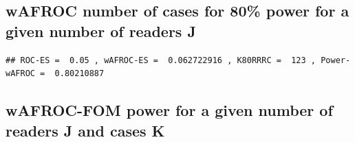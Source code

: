 \documentclass[
]{book}
\newenvironment{Shaded}{\begin{snugshade}}{\end{snugshade}}
\newcommand{\AttributeTok}[1]{\textcolor[rgb]{0.77,0.63,0.00}{#1}}
\newcommand{\ConstantTok}[1]{\textcolor[rgb]{0.00,0.00,0.00}{#1}}
\newcommand{\DecValTok}[1]{\textcolor[rgb]{0.00,0.00,0.81}{#1}}
\newcommand{\FunctionTok}[1]{\textcolor[rgb]{0.00,0.00,0.00}{#1}}
\newcommand{\NormalTok}[1]{#1}
\newcommand{\OtherTok}[1]{\textcolor[rgb]{0.56,0.35,0.01}{#1}}
\newcommand{\SpecialCharTok}[1]{\textcolor[rgb]{0.00,0.00,0.00}{#1}}
\newcommand{\StringTok}[1]{\textcolor[rgb]{0.31,0.60,0.02}{#1}}
\begin{document}
\hypertarget{wafroc-number-of-cases-for-80-power-for-a-given-number-of-readers-j}{%
\subsection{wAFROC number of cases for 80\% power for a given number of readers J}\label{wafroc-number-of-cases-for-80-power-for-a-given-number-of-readers-j}}

\begin{Shaded}
\end{Shaded}

\begin{verbatim}
## ROC-ES =  0.05 , wAFROC-ES =  0.062722916 , K80RRRC =  123 , Power-wAFROC =  0.80210887
\end{verbatim}

\hypertarget{wafroc-fom-power-for-a-given-number-of-readers-j-and-cases-k}{%
\subsection{wAFROC-FOM power for a given number of readers J and cases K}\label{wafroc-fom-power-for-a-given-number-of-readers-j-and-cases-k}}
\end{document}
